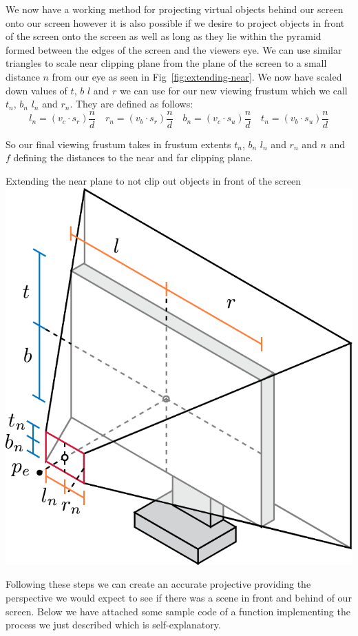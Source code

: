We now have a working method for projecting virtual objects behind our screen onto our screen however it is also possible if we desire to project objects in front of the screen onto the screen as well as long as they lie within the pyramid formed between the edges of the screen and the viewers eye. We can use similar triangles to scale near clipping plane from the plane of the screen to a small distance $n$ from our eye as seen in Fig~\ref{fig:extending-near}. We now have scaled down values of $t$, $b$ $l$ and $r$ we can use for our new viewing frustum which we call $t_n$, $b_n$ $l_n$ and $r_n$. They are defined as follows:
\[
    l_n = (v_c \cdot s_r) \frac{n}{d} \quad r_n = (v_b \cdot s_r) \frac{n}{d} \quad b_n = (v_c \cdot s_u) \frac{n}{d} \quad t_n = (v_b \cdot s_u) \frac{n}{d}
\]

So our final viewing frustum takes in frustum extents $t_n$, $b_n$ $l_n$ and $r_n$ and $n$ and $f$ defining the distances to the near and far clipping plane.
\begin{figureBox}[label={fig:extending-near}, width=0.8\linewidth]{Extending the near plane to not clip out objects in front of the screen}
    \centering
    \includegraphics[width = 0.5\linewidth]{./background/figures/projection/extending-near.pdf}
\end{figureBox}

Following these steps we can create an accurate projective providing the perspective we would expect to see if there was a scene in front and behind of our screen. Below we have attached some sample code of a function implementing the process we just described which is self-explanatory.

